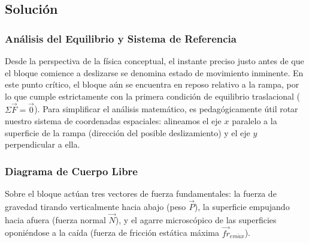 \documentclass[12pt]{article}
\begin{document}
\subsection*{Solución}

\subsubsection*{Análisis del Equilibrio y Sistema de Referencia}
Desde la perspectiva de la física conceptual, el instante preciso justo antes de que el bloque comience a deslizarse se denomina estado de movimiento inminente. En este punto crítico, el bloque aún se encuentra en reposo relativo a la rampa, por lo que cumple estrictamente con la primera condición de equilibrio traslacional ($\Sigma\vec{F} = \vec{0}$). Para simplificar el análisis matemático, es pedagógicamente útil rotar nuestro sistema de coordenadas espaciales: alineamos el eje $x$ paralelo a la superficie de la rampa (dirección del posible deslizamiento) y el eje $y$ perpendicular a ella.

\subsubsection*{Diagrama de Cuerpo Libre}
Sobre el bloque actúan tres vectores de fuerza fundamentales: la fuerza de gravedad tirando verticalmente hacia abajo (peso $\vec{P}$), la superficie empujando hacia afuera (fuerza normal $\vec{N}$), y el agarre microscópico de las superficies oponiéndose a la caída (fuerza de fricción estática máxima $\vec{fr}_{em\acute{a}x}$).
\end{document}
